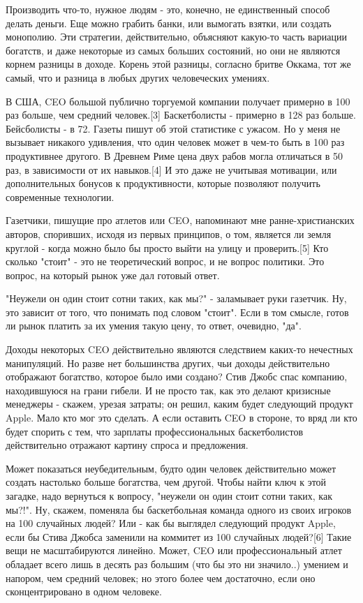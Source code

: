 \documentclass[ebook,12pt,oneside,openany]{memoir}
\begin{document}
Производить что-то, нужное людям - это, конечно, не единственный
способ делать деньги. Еще можно грабить банки, или вымогать взятки,
или создать монополию. Эти стратегии, действительно, объясняют
какую-то часть вариации богатств, и даже некоторые из самых больших
состояний, но они не являются корнем разницы в доходе. Корень этой
разницы, согласно бритве Оккама, тот же самый, что и разница в любых
других человеческих умениях.

В США, CEO большой публично торгуемой компании получает примерно в 100
раз больше, чем средний человек.[3] Баскетболисты - примерно в 128 раз
больше. Бейсболисты - в 72. Газеты пишут об этой статистике с ужасом.
Но у меня не вызывает никакого удивления, что один человек может в
чем-то быть в 100 раз продуктивнее другого. В Древнем Риме цена двух
рабов могла отличаться в 50 раз, в зависимости от их навыков.[4] И это
даже не учитывая мотивации, или дополнительных бонусов к
продуктивности, которые позволяют получить современные технологии.

Газетчики, пишущие про атлетов или CEO, напоминают мне
ранне-христианских авторов, споривших, исходя из первых принципов, о
том, является ли земля круглой - когда можно было бы просто выйти на
улицу и проверить.[5] Кто сколько "стоит" - это не теоретический
вопрос, и не вопрос политики. Это вопрос, на который рынок уже дал
готовый ответ.

"Неужели он один стоит сотни таких, как мы?" - заламывает руки
газетчик. Ну, это зависит от того, что понимать под словом "стоит".
Если в том смысле, готов ли рынок платить за их умения такую цену, то
ответ, очевидно, "да".

Доходы некоторых CEO действительно являются следствием каких-то
нечестных манипуляций. Но разве нет большинства других, чьи доходы
действительно отображают богатство, которое было ими создано? Стив
Джобс спас компанию, находившуюся на грани гибели. И не просто так,
как это делают кризисные менеджеры - скажем, урезая затраты; он решил,
каким будет следующий продукт Apple. Мало кто мог это сделать. А если
оставить CEO в стороне, то вряд ли кто будет спорить с тем, что
зарплаты профессиональных баскетболистов действительно отражают
картину спроса и предложения.

Может показаться неубедительным, будто один человек действительно
может создать настолько больше богатства, чем другой. Чтобы найти ключ
к этой загадке, надо вернуться к вопросу, "неужели он один стоит сотни
таких, как мы?!". Ну, скажем, поменяла бы баскетбольная команда одного
из своих игроков на 100 случайных людей? Или - как бы выглядел
следующий продукт Apple, если бы Стива Джобса заменили на коммитет из
100 случайных людей?[6] Такие вещи не масштабируются линейно. Может,
CEO или профессиональный атлет обладает всего лишь в десять раз
большим (что бы это ни значило..) умением и напором, чем средний
человек; но этого более чем достаточно, если оно сконцентрировано в
одном человеке.
\end{document}
